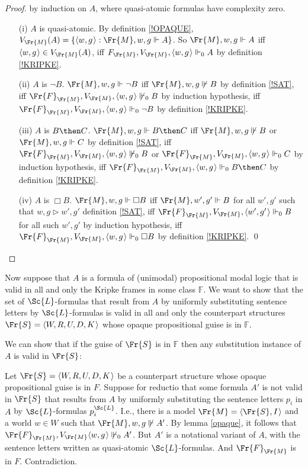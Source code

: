 \documentclass[11pt]{woarticle}
\theoremstyle{break}
\theoremstyle{nonumberplain}
\newcommand{\SAT}{\Vdash}
\newcommand{\Img}{\triangleright}
\newcommand{\1}{\;\,|\;\,}
\renewcommand{\t}[1]{\ensuremath{\langle #1  \makebox[.2ex]{}\rangle}}
\begin{document}
{  \begin{proof} by induction on $A$, where quasi-atomic formulas
    have complexity zero.
    \begin{itemize}
      \item[(i)] $A$ is quasi-atomic. By definition \ref{!OPAQUE},
            $V_{\Fr{M}}(A) = \{ \t{w,g} : \Fr{M},w,g \SAT A \}$. So
            $\Fr{M},w,g \SAT A$ iff $\t{w,g} \in V_{\Fr{M}}(A)$, iff
            $F_{\Fr{M}},V_{\Fr{M}},\t{w,g} \SAT_0 A$ by definition \ref{!KRIPKE}.
      \item[(ii)] $A$ is $\neg B$. $\Fr{M},w,g \SAT \neg B$ iff
            $\Fr{M},w,g \not\SAT B$ by definition \ref{!SAT}, iff
            $\Fr{F}_{\Fr{M}},V_{\Fr{M}},\t{w,g} \not\SAT_0 B$ by induction hypothesis,
            iff $\Fr{F}_{\Fr{M}},V_{\Fr{M}},\t{w,g} \SAT_0\neg B$ by definition
            \ref{!KRIPKE}.
      \item[(iii)] $A$ is $B \then C$. $\Fr{M},w,g \SAT B \then C$ iff
            $\Fr{M},w,g \not\SAT B$ or $\Fr{M},w,g \SAT C$ by definition
            \ref{!SAT}, iff $\Fr{F}_{\Fr{M}},V_{\Fr{M}},\t{w,g} \not\SAT_0 B$ or
            $\Fr{F}_{\Fr{M}},V_{\Fr{M}},\t{w,g} \SAT_0 C$ by induction hypothesis,
            iff $\Fr{F}_{\Fr{M}},V_{\Fr{M}},\t{w,g} \SAT_0 B\then C$ by definition
            \ref{!KRIPKE}.
      \item[(iv)] $A$ is $\Box B$. $\Fr{M},w,g \SAT \Box B$ iff
            $\Fr{M},w',g' \SAT B$ for all $w',g'$ such that $w,g\Img w',g'$
            definition \ref{!SAT}, iff
            $\Fr{F}_{\Fr{M}},V_{\Fr{M}},\t{w',g'} \SAT_0 B$ for all such $w',g'$
            by induction hypothesis, iff
            $\Fr{F}_{\Fr{M}},V_{\Fr{M}},\t{w,g} \SAT_0 \Box B$ by definition
            \ref{!KRIPKE}. \qed
    \end{itemize}
  \end{proof}

  Now suppose that $A$ is a formula of (unimodal) propositional modal logic that
  is valid in all and only the Kripke frames in some class $\mathbb{F}$. We want
  to show that the set of $\Sc{L}$-formulas that result from $A$ by uniformly
  substituting sentence letters by $\Sc{L}$-formulas is valid in all and only
  the counterpart structures $\Fr{S} = \t{W,R,U,D,K}$ whose opaque propositional
  guise is in $\mathbb{F}$.

  We can show that if the guise of $\Fr{S}$ is in $\mathbb{F}$ then any
  substitution instance of $A$ is valid in $\Fr{S}$:
  
  Let $\Fr{S} = \t{W,R,U,D,K}$ be a counterpart structure whose opaque
  propositional guise is in $F$. Suppose for reductio that some formula $A'$ is
  not valid in $\Fr{S}$ that results from $A$ by uniformly substituting the
  sentence letters $p_i$ in $A$ by $\Sc{L}$-formulas $p_i^{\Sc{L}}$. I.e., there
  is a model $\Fr{M} = \t{\Fr{S},I}$ and a world $w\in W$ such that
  $\Fr{M},w,g \not\SAT A'$. By lemma \ref{opaque}, it follows that
  $\Fr{F}_{\Fr{M}},V_{\Fr{M}}\t{w,g} \not\SAT_0 A'$. But $A'$ is a notational
  variant of $A$, with the sentence letters written as quasi-atomic
  $\Sc{L}$-formulas. And $\Fr{F}_{\Fr{M}}$ is in $F$. Contradiction.

}
\end{document}
